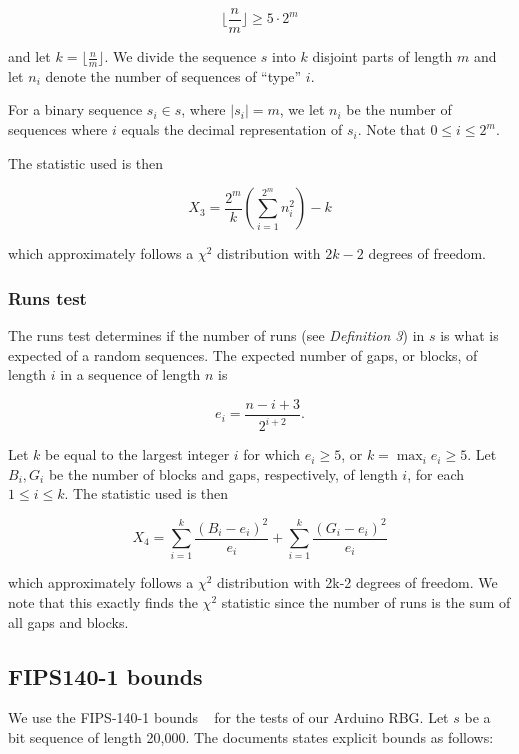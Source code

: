 \documentclass[a4paper]{article}           %
\begin{document}
\[
\lfloor \frac n m \rfloor \geq 5 \cdot 2^m  
\]

and let $k = \lfloor \frac n m \rfloor$. We divide the sequence $s$ into $k$ disjoint parts of length $m$ and let $n_i$ denote the number of sequences of ``type'' $i$.

For a binary sequence $s_i \in s$, where $|s_i| = m$, we let $n_i$ be the number of sequences where $i$ equals the decimal representation of $s_i$. Note that $0 \leq i \leq 2^m$. 

The statistic used is then

\begin{equation}
X_3 = \frac{2^m}{k} \left( \sum_{i=1}^{2^m} n_i^2 \right) - k
\end{equation}

which approximately follows a $\chi^2$ distribution with $2k - 2$ degrees of freedom.
 
\subsubsection{Runs test}

The runs test determines if the number of runs (see \textit{Definition 3}) in $s$ is what is expected of a random sequences. The expected number of gaps, or blocks, of length $i$ in a sequence of length $n$ is

\[
e_i = \frac{n-i+3}{2^{i+2}}.
\]

Let $k$ be equal to the largest integer $i$ for which $e_i \geq 5$, or $k = \max_i e_i \geq 5$. Let $B_i, G_i$ be the number of blocks and gaps, respectively, of length $i$, for each $ 1 \leq i \leq k$. The statistic used is then

\begin{equation}
X_4 = \sum_{i=1}^k \frac{(B_i - e_i)^2}{e_i} + \sum_{i=1}^k \frac{(G_i - e_i)^2}{e_i}
\end{equation}

which approximately follows a $\chi^2$ distribution with 2k-2 degrees of freedom. We note that this exactly finds the $\chi^2$ statistic since the number of runs is the sum of all gaps and blocks. 

\subsection{FIPS140-1 bounds}

We use the FIPS-140-1 bounds ~\cite{fips140} for the tests of our Arduino RBG. Let $s$ be a bit sequence of length 20,000. The documents states explicit bounds as follows:
\end{document}
